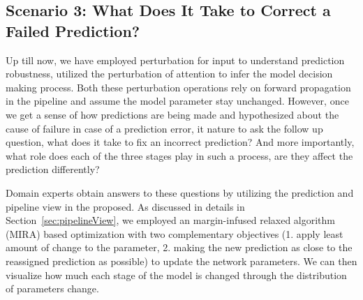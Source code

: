 





\subsection{Scenario 3: What Does It Take to Correct a Failed Prediction?}
Up till now, we have employed perturbation for input to understand prediction robustness, utilized the perturbation of attention to infer the model decision making process. Both these perturbation operations rely on forward propagation in the pipeline and assume the model parameter stay unchanged. 
%
However, once we get a sense of how predictions are being made and hypothesized about the cause of failure in case of a prediction error, it nature to ask the follow up question, what does it take to fix an incorrect prediction? And more importantly, what role does each of the three stages play in such a process, are they affect the prediction differently?

Domain experts obtain answers to these questions by utilizing the prediction and pipeline view in the proposed. As discussed in details in Section~\ref{sec:pipelineView}, we employed an margin-infused relaxed algorithm (MIRA) based optimization with two complementary objectives (1. apply least amount of change to the parameter, 2. making the new prediction as close to the reassigned prediction as possible) to update the network parameters.
%
We can then visualize how much each stage of the model is changed through the distribution of parameters change.

